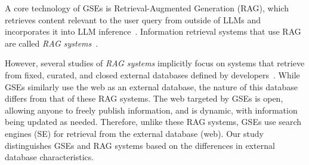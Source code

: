 A core technology of GSEs is Retrieval-Augmented Generation (RAG), which retrieves content relevant to the user query from outside of LLMs and incorporates it into LLM inference~\cite{internet-augmented-language-models-fewshot-arxiv22, internet-augmented-dialogue-generation-arxiv21, rag-kdd24}.
Information retrieval systems that use RAG are called \emph{RAG systems}~\cite{mirage-acl24, lála2023paperqa, almanac-nejmai-2024}.

However, several studies of \emph{RAG systems} implicitly focus on systems that retrieve from fixed, curated, and closed external databases defined by developers~\cite{mirage-acl24, lála2023paperqa, almanac-nejmai-2024}.
While GSEs similarly use the web as an external database, the nature of this database differs from that of these RAG systems.
The web targeted by GSEs is open, allowing anyone to freely publish information, and is dynamic, with information being updated as needed.
Therefore, unlike these RAG systems, GSEs use search engines (SE) for retrieval from the external database (web).
Our study distinguishes GSEs and RAG systems based on the differences in external database characteristics.
